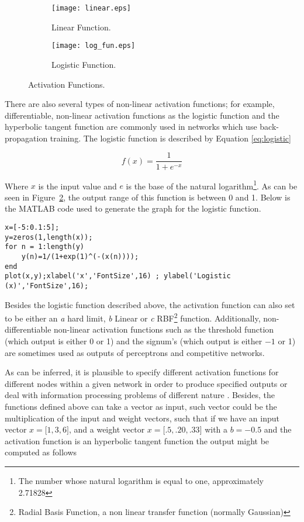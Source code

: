 \documentclass{WileySev}
\begin{document}
\begin{figure}[h!]
  \centering
  \begin{subfigure}[b]{0.4\linewidth}
    \texttt{[image: linear.eps]}
    \caption{Linear Function.}
    \label{fig:linear}
  \end{subfigure}
  \begin{subfigure}[b]{0.4\linewidth}
    \texttt{[image: log\_fun.eps]}
    \caption{Logistic Function.}
    \label{fig:logistic}
  \end{subfigure}
  \caption{Activation Functions.}
  \label{fig:functions}
\end{figure}

There are also several types of non-linear activation functions; for example, differentiable, non-linear activation functions as the logistic function and the hyperbolic tangent function are commonly used in networks which use back-propagation training. The logistic function is described by Equation \ref{eq:logistic}

\begin{equation}
f(x)=\frac{1}{1+e^{-x}} \label{eq:logistic}
\end{equation}

Where $x$ is the input value and $e$ is the base of the natural logarithm\footnote{The number whose natural logarithm is equal to one, approximately 2.71828}. As can be seen in Figure~\ref{fig:logistic}, the output range of this function is between 0 and 1. Below is the MATLAB code used to generate the graph for the logistic function.

\begin{lstlisting}
x=[-5:0.1:5];
y=zeros(1,length(x));
for n = 1:length(y)
    y(n)=1/(1+exp(1)^(-(x(n))));
end
plot(x,y);xlabel('x','FontSize',16) ; ylabel('Logistic (x)','FontSize',16);
\end{lstlisting}

Besides the logistic function described above, the activation function can also set to be either an \textit{a} hard limit, \textit{b} Linear or \textit{c} RBF\footnote{Radial Basis Function, a non linear transfer function (normally Gaussian)} function. Additionally, non-differentiable non-linear activation functions such as the threshold function (which output is either 0 or 1) and the signum's (which output is either $-1$ or 1) are sometimes used as outputs of perceptrons and competitive networks.

As can be inferred, it is plausible to specify different activation functions for different nodes within a given network in order to produce specified outputs or deal with information processing problems of different nature \cite{jiang2010medical}. Besides, the functions defined above can take a vector as input, such vector could be the multiplication of the input and weight vectors, such that if we have an input vector $x=\big[1,3,6\big]$, and a weight vector $x=\big[.5,.20,.33\big]$ with a $b=-0.5$ and the activation function is an hyperbolic tangent function the output might be computed as follows
\end{document}
